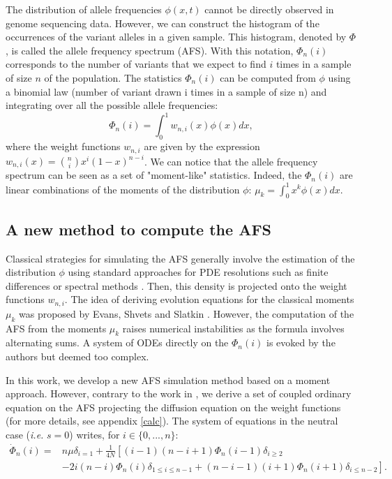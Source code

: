 The distribution of allele frequencies $\phi(x,t)$ cannot be directly observed in genome sequencing data. However, we can construct the histogram of the occurrences of the variant alleles in a given sample. This histogram, denoted by $\Phi$, is called the allele frequency spectrum (AFS). With this notation, $\Phi_n(i)$ corresponds to the number of variants that we expect to find $i$ times in a sample of size $n$ of the population. The statistics $\Phi_n(i)$ can be computed from $\phi$ using a binomial law (number of variant drawn i times in a sample of size n) and integrating over all the possible allele frequencies: 
$$
	 \Phi_n(i) = \int_0^1 w_{n,i}(x) \phi(x) dx,
$$
where the weight functions $w_{n,i}$ are given by the expression $w_{n,i}(x) = {n\choose i}  x^i (1-x)^{n-i}$.
We can notice that the allele frequency spectrum can be seen as a set of "moment-like" statistics. Indeed, the $\Phi_n(i)$ are linear combinations of the moments of the distribution $\phi$: $\mu_k = \int_0^1 x^k \phi(x)dx$.

\subsection{A new method to compute the AFS}
Classical strategies for simulating the AFS generally involve the estimation of the distribution $\phi$ using standard approaches for PDE resolutions such as finite differences \cite{gutenkunst2009} or spectral methods \cite{lukic2011}. Then, this density is projected onto the weight functions $w_{n,i}$.
The idea of deriving evolution equations for the classical moments $\mu_k$ was proposed by Evans, Shvets and Slatkin \cite{evans2007}. However, the computation of the AFS from the moments $\mu_k$ raises numerical instabilities as the formula involves alternating sums. A system of ODEs directly on the $\Phi_n(i)$ is evoked by the authors but deemed too complex.

In this work, we develop a new AFS simulation method based on a moment approach. However, contrary to the work in \cite{evans2007}, we derive a set of coupled ordinary equation on the AFS projecting the diffusion equation on the weight functions (for more details, see appendix \ref{calc}). The system of equations in the neutral case (\textit{i.e.} $s = 0$) writes, for $i \in \{0,... , n\}$:
\begin{equation}
\begin{split}
\dot \Phi_n(i)=& n\mu  \delta_{i=1} + \frac{1}{4 N} \left[ (i-1)(n-i+1) \Phi_n(i-1)\delta_{i\geq 2} \right.\\
		      & \left.-2i(n-i)\Phi_n(i)\delta_{1\leq i\leq n-1}  + (n-i-1)(i+1)\Phi_n(i+1)\delta_{i\leq n-2} \right].
\end{split}
\label{eq:neutral}
\end{equation}

